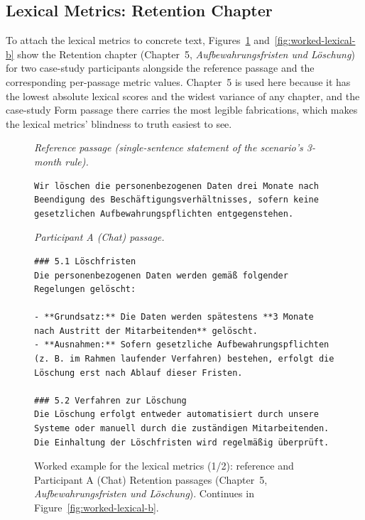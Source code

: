 \subsection{Lexical Metrics: Retention Chapter}
\label{app:worked-lexical}

To attach the lexical metrics to concrete text,
Figures~\ref{fig:worked-lexical-a} and~\ref{fig:worked-lexical-b}
show the Retention chapter (Chapter~5,
\emph{Aufbewahrungsfristen und Löschung}) for two case-study
participants alongside the reference passage and the
corresponding per-passage metric values. Chapter~5 is used here
because it has the lowest absolute lexical scores and the widest
variance of any chapter, and the case-study Form passage there
carries the most legible fabrications, which makes the lexical
metrics' blindness to truth easiest to see.

\begingroup
{}
\begin{figure}[!htbp]
\centering
\noindent\textit{Reference passage (single-sentence statement of the scenario's 3-month rule).}
\begin{lstlisting}
Wir löschen die personenbezogenen Daten drei Monate nach Beendigung des Beschäftigungsverhältnisses, sofern keine gesetzlichen Aufbewahrungspflichten entgegenstehen.
\end{lstlisting}

\noindent\textit{Participant A (Chat) passage.}
\begin{lstlisting}
### 5.1 Löschfristen
Die personenbezogenen Daten werden gemäß folgender Regelungen gelöscht:

- **Grundsatz:** Die Daten werden spätestens **3 Monate nach Austritt der Mitarbeitenden** gelöscht.
- **Ausnahmen:** Sofern gesetzliche Aufbewahrungspflichten (z. B. im Rahmen laufender Verfahren) bestehen, erfolgt die Löschung erst nach Ablauf dieser Fristen.

### 5.2 Verfahren zur Löschung
Die Löschung erfolgt entweder automatisiert durch unsere Systeme oder manuell durch die zuständigen Mitarbeitenden. Die Einhaltung der Löschfristen wird regelmäßig überprüft.
\end{lstlisting}
\caption{Worked example for the lexical metrics (1/2): reference
and Participant A (Chat) Retention passages (Chapter~5,
\emph{Aufbewahrungsfristen und L\"oschung}). Continues in
Figure~\ref{fig:worked-lexical-b}.}
\label{fig:worked-lexical-a}
\end{figure}

